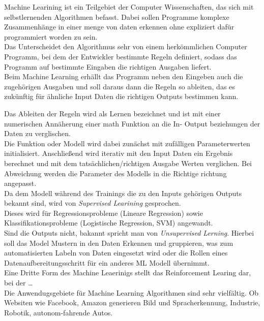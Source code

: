Machine Learining ist ein Teilgebiet der Computer Wissenschaften, 
das sich mit selbstlernenden Algorithmen befasst. Dabei sollen 
Programme komplexe Zusammenhänge in einer menge von daten 
erkennen ohne expliziert dafür programmiert worden zu sein.
\\
Das Unterscheidet den Algorithmus sehr von einem herkömmlichen 
Computer Programm, bei dem der Entwickler bestimmte Regeln 
definiert, sodass das Programm auf bestimmte Eingaben 
die richtigen Ausgaben liefert.
\\
Beim Machine Learning erhällt das Programm neben den 
Eingeben auch die zugehörigen Ausgaben und soll daraus 
dann die Regeln so ableiten, das es zukünftig für ähnliche 
Input Daten die richtigen Outputs bestimmen kann.
\vspace{0.5cm}
\begin{figure}[htb]
    \centering
    \def\svgwidth{0.8\columnwidth}
    \footnotesize
    
\end{figure}
\vspace{0.5cm}


Das Ableiten der Regeln wird als Lernen bezeichnet und ist 
mit einer numerischen Annäherung einer math Funktion an die In- Output 
beziehungen der Daten zu verglischen.
\\
Die Funktion oder Modell wird dabei zunächst mit zufälligen 
Parameterwerten initialisiert. Anschließend wird iterativ mit den 
Input Daten ein Ergebnis berechnet und mit dem tatsächlichen/richtigen 
Ausgabe Werten verglichen. Bei Abweichung werden die Parameter des 
Modells in die Richtige richtung angepasst.
\\
Da dem Modell während des Trainings die zu den Inputs gehörigen 
Outputs bekannt sind, wird von \textit{Supervised Learining} 
gesprochen.
\\
Dieses wird für Regressionsprobleme (Lineare Regression) sowie 
Klassifikationsprobleme (Logistische Regression, SVM) angewandt.
\\
Sind die Outputs nicht, bakannt spricht man von \textit{Unsupervised 
Lerning}. Hierbei soll das Model Mustern in den Daten Erkennen und 
gruppieren, was zum automatisierten Labeln von Daten eingesetzt 
wird oder die Rollen eines Datenaufbereitungsschritt für ein 
anderes ML Modell übernimmt.
\\
Eine Dritte Form des Machine Leaerinigs stellt das Reinforcement Learing 
dar, bei der \dots
\\
Die Anwendugsgebiete für Machine Learning Algorithmen sind 
sehr vielfältig. Ob Websiten wie Facebook, Amazon generieren 
Bild und Spracherkennung, Industrie, Robotik, autonom-fahrende Autos.

